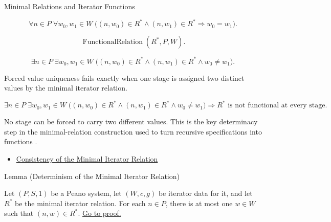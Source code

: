 \begin{topicbox}{Minimal Relations and Iterator Functions}
\begin{remark*}
\[
\forall n\in P\;\forall w_0,w_1\in W\;
\bigl((n,w_0)\in R^*\land (n,w_1)\in R^*\Longrightarrow w_0=w_1\bigr).
\]
\end{remark*}

\begin{remark*}
\[
\operatorname{FunctionalRelation}(R^*,P,W).
\]
\end{remark*}

\begin{remark*}
\[
\exists n\in P\;\exists w_0,w_1\in W\;
\bigl((n,w_0)\in R^*\land (n,w_1)\in R^*\land w_0\neq w_1\bigr).
\]
\end{remark*}

\begin{remark*}
Forced value uniqueness fails exactly when one stage is assigned two distinct
values by the minimal iterator relation.
\end{remark*}

\begin{remark*}
\[
\exists n\in P\;\exists w_0,w_1\in W\;
\bigl((n,w_0)\in R^*\land (n,w_1)\in R^*\land w_0\neq w_1\bigr)
\Longrightarrow
R^* \text{ is not functional at every stage}.
\]
\end{remark*}

\begin{remark*}[Interpretation]
No stage can be forced to carry two different values. This is the key
determinacy step in the minimal-relation construction used to turn recursive
specifications into functions \citep{FefermanNumberSystems1964}.
\end{remark*}

\begin{dependencies}
\begin{itemize}
  \item \hyperref[lem:iterator-relation-consistency]{Consistency of the Minimal Iterator Relation}
\end{itemize}
\end{dependencies}

\begin{lemmabox}{Lemma (Determinism of the Minimal Iterator Relation)}
\begin{lemma}
\label{lem:minimal-iterator-relation-deterministic}
Let $(P,S,1)$ be a Peano system, let $(W,c,g)$ be iterator data for it, and let
$R^*$ be the minimal iterator relation. For each $n\in P$, there is at most one
$w\in W$ such that $(n,w)\in R^*$.
\hyperref[prf:minimal-iterator-relation-deterministic]{Go to proof.}
\end{lemma}
\end{lemmabox}


\end{topicbox}
